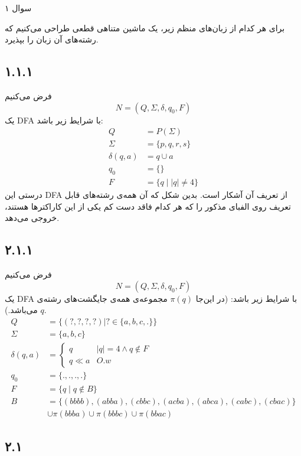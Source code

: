 سوال ۱


برای هر کدام از زبان‌های منظم زیر، یک ماشین متناهی قطعی طراحی می‌کنیم که رشته‌های آن زبان را بپذیرد.

\subsection*{۱.۱.۱}

فرض می‌کنیم 
$$N = (Q, \Sigma, \delta, q_0, F)$$
یک DFA با شرایط زیر باشد:
\begin{align*}
	Q &= P(\Sigma)\\
	\Sigma &= \{p,q,r,s\} \\
	\delta(q,a) &= q \cup a \\
	q_0 &= \{\} \\
	F &= \{q \mid |q| \neq 4\}
\end{align*}
درستی این DFA از تعریف آن آشکار است. بدین شکل که آن همه‌ی رشته‌های قابل تعریف روی الفبای مذکور را که هر کدام فاقد دست کم یکی از این کاراکترها هستند، خروجی می‌دهد.

\subsection*{۲.۱.۱}

فرض می‌کنیم 
$$N = (Q, \Sigma, \delta, q_0, F)$$
یک DFA با شرایط زیر باشد:
(در این‌جا $\pi(q)$ مجموعه‌ی همه‌ی جایگشت‌های رشته‌ی $q.$ می‌باشد.)
\begin{align*}
	Q &= \{(?, ?, ?, ?) | ? \in \{a, b, c, .\}\} \\ 
	\Sigma &= \{a,b,c\} \\
	\delta(q, a) &= \begin{cases}
		q & |q| = 4 \land q \notin F  \\
		q \ll a & O.w
	\end{cases} \\ 
	q_0 &= \{., ., ., .\} \\
	F &= \{q \mid q \notin B\} \\
	B &= \{(bbbb), (abba), (cbbc), (acba), (abca), (cabc), (cbac)\} \\ &\cup \pi(bbba) \cup \pi(bbbc)\cup \pi(bbac)
\end{align*}

\subsection*{۲.۱}


